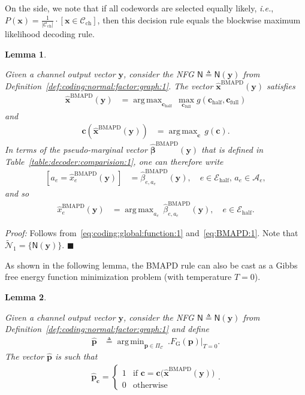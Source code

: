 \documentclass[journal, twocolumn]{IEEEtran}
\renewcommand{\mathbf}[1]{{\bm{#1}}}
\newcommand{\ie}{\emph{i.e.}}
\DeclareMathOperator*{\argmax}{arg\,max}
\newcommand{\vect}[1]{\mathbf{#1}}
\newcommand{\code}[1]{\mathcal{#1}}
\newcommand{\set}[1]{\mathcal{#1}}
\newcommand{\graph}[1]{\mathsf{#1}}
\DeclareMathOperator*{\argmin}{arg\,min}
\newcommand{\defeq}{\triangleq}
\newcommand{\codeC}{\code{C}}
\newcommand{\codeCchannel}{\code{C}_{\mathrm{ch}}}
\newcommand{\bel}{\beta}
\newcommand{\hbel}{\hat \bel}
\newcommand{\hvbel}{\boldsymbol{\hat \bel}}
\newcommand{\setA}{\set{A}}
\newcommand{\setEhalf}{\set{E}_{\mathrm{half}}}
\newcommand{\vc}{\vect{c}}
\newcommand{\vcfull}{\vc_{\mathrm{full}}}
\newcommand{\vchalf}{\vc_{\mathrm{half}}}
\newcommand{\vp}{\vect{p}}
\newcommand{\vx}{\vect{x}}
\newcommand{\BMAPD}{\mathrm{BMAPD}}
\newcommand{\hvxBMAPD}{\vect{\hat x}^{\mathrm{BMAPD}}}
\newcommand{\hxBMAPD}{\hat x^{\mathrm{BMAPD}}}
\newcommand{\vy}{\vect{y}}
\newcommand{\graphN}{\graph{N}}
\newcommand{\cover}[1]{\tilde{#1}}
\newcommand{\cset}[1]{\cover{\set{#1}}}
\newcommand{\card}[1]{\left\lvert #1 \right\rvert}
\newcommand{\?}{\mathrm{?}}
\newcommand{\qedblack}{\hspace*{\fill}%
  $\blacksquare$\smallskip}
\newcommand{\FGibbs}{F_{\mathrm{G}}}
\newcommand{\setPi}{\Pi}
\newtheorem{Lemma}{Lemma}
\newenvironment{Proof}%
  {\noindent \emph{Proof:}}{\qedblack}
\begin{document}
On the side, we note that if all codewords are selected equally likely, \ie,
$P(\vx) = \frac{1}{\card{\codeCchannel}} \cdot [\vx \in \codeCchannel]$, then
this decision rule equals the blockwise maximum likelihood decoding rule.


\begin{Lemma}
  \label{lemma:BMAPD:reformulation:1}

  Given a channel output vector $\vy$, consider the NFG
  $\graphN \defeq \graphN(\vy)$ from
  Definition~\ref{def:coding:normal:factor:graph:1}. The vector
  $\hvxBMAPD(\vy)$ satisfies
  \begin{align*}
    \hvxBMAPD(\vy)
      &= \argmax_{\vchalf} \,
           \max_{\vcfull}
             g(\vchalf, \vcfull)
  \end{align*}
  and
  \begin{align*}
    \vc
      \left(
        \hvxBMAPD(\vy)
      \right)
      &= \argmax_{\vc} \,
           g(\vc).
  \end{align*}
  In terms of the pseudo-marginal vector $\hvbel^{\BMAPD}(\vy)$ that is
  defined in Table~\ref{table:decoder:comparision:1}, one can therefore write
  \begin{align*}
    \left[
      a_e \! = \! \hxBMAPD_e(\vy)
    \right]
      &= \hbel_{e,a_e}^{\BMAPD}(\vy),
           \quad e \in \setEhalf, \, a_e \in \setA_e,
  \end{align*}
  and so
  \begin{align*}
    \hxBMAPD_e(\vy)
      &= \argmax_{a_e} \,
           \hbel_{e,a_e}^{\BMAPD}(\vy),
             \quad e \in \setEhalf.
  \end{align*}
\end{Lemma}


\begin{Proof}
  Follows from~\eqref{eq:coding:global:function:1}
  and~\eqref{eq:BMAPD:1}. Note that $\cset{N}_1 = \bigl\{ \graphN(\vy)
  \bigr\}$.
\end{Proof}


As shown in the following lemma, the BMAPD rule can also be cast as a Gibbs
free energy function minimization problem (with temperature $T = 0$).


\begin{Lemma}
  \label{lemma:BMAPD:reformulation:2}

  Given a channel output vector $\vy$, consider the NFG
  $\graphN \defeq \graphN(\vy)$ from
  Definition~\ref{def:coding:normal:factor:graph:1} and define
  \begin{align*}
    \hat \vp
      &\defeq
         \argmin_{\vp \in \setPi_\codeC} \ 
           \Big.
             \FGibbs(\vp)
           \Big|_{T = 0}.
  \end{align*}
  The vector $\hat \vp$ is such that
  \begin{align*}
    \hat \vp_{\vc}
      = \begin{cases}
          1 & \text{if $\vc = \vc\bigl( \hvxBMAPD(\vy) \bigr)$} \\
          0 & \text{otherwise}
        \end{cases}.
  \end{align*}
\end{Lemma}
\end{document}
